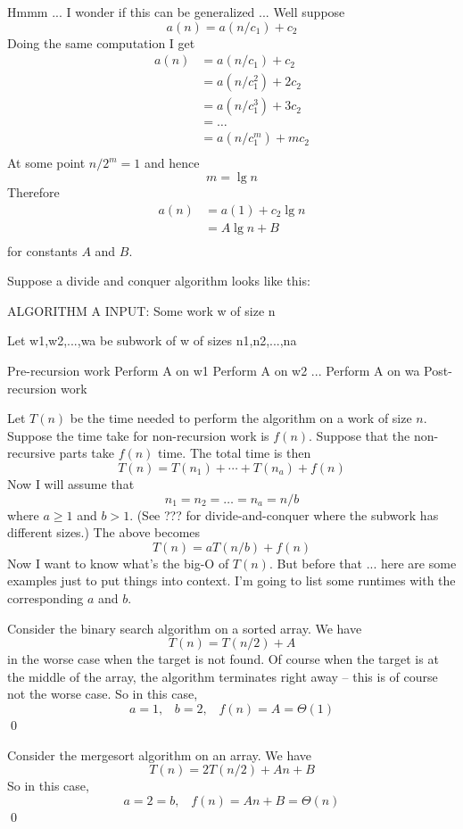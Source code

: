 Hmmm ... I wonder if this can be generalized ...
Well suppose
\[
a(n) = a(n/c_1) + c_2
\]
Doing the same computation I get
\begin{align*}
a(n) 
&= a(n/c_1) + c_2 \\
&= a(n/c_1^2) + 2c_2 \\
&= a(n/c_1^3) + 3c_2 \\
&= \ldots \\
&= a(n/c_1^m) + mc_2 \\
\end{align*}
At some point $n/2^m = 1$ and hence
\[
m = \lg n
\]
Therefore
\begin{align*}
a(n) 
&= a(1) + c_2 \lg n\\
&= A \lg n + B\\
\end{align*}
for constants $A$ and $B$.

Suppose a divide and conquer algorithm looks like this:
\begin{console}
ALGORITHM A
INPUT: Some work w of size n

Let w1,w2,...,wa be subwork of w of sizes n1,n2,...,na

Pre-recursion work
Perform A on w1
Perform A on w2
...
Perform A on wa
Post-recursion work
\end{console}

Let $T(n)$ be the time needed to perform the algorithm on a work of
size $n$.
Suppose the time take for non-recursion work is $f(n)$.
Suppose that the non-recursive parts take $f(n)$ time.
The total time is then
\[
T(n)
= T(n_1) + \cdots + T(n_a) + f(n)
\]
Now I will assume that
\[
n_1 = n_2 = \ldots = n_a = n / b
\]
where $a \geq 1$ and $b > 1$.
(See ??? for divide-and-conquer where the subwork has different sizes.)
The above becomes
\[
T(n)
= a T(n/b) + f(n)
\]
Now I want to know what's the big-O of $T(n)$.
But before that ... here are some examples just to put things into
context.
I'm going to list some runtimes with the corresponding $a$ and $b$.

\begin{eg}
Consider the binary search algorithm on a sorted array.
We have 
\[
T(n) = T(n/2) + A
\]
in the worse case when the target is not found.
Of course when the target is at the middle of the array, the algorithm
terminates right away -- this is of course not the worse case.
So in this case,
\[
a = 1, \,\,\,\,\, b=2, \,\,\,\,\, f(n) = A = \Theta(1)
\]
\qed
\end{eg}

\begin{eg}
Consider the mergesort algorithm on an array.
We have 
\[
T(n) = 2T(n/2) + An + B
\]
So in this case,
\[
a = 2 = b, \,\,\,\,\, f(n) = An + B = \Theta(n)
\]
\qed
\end{eg}


